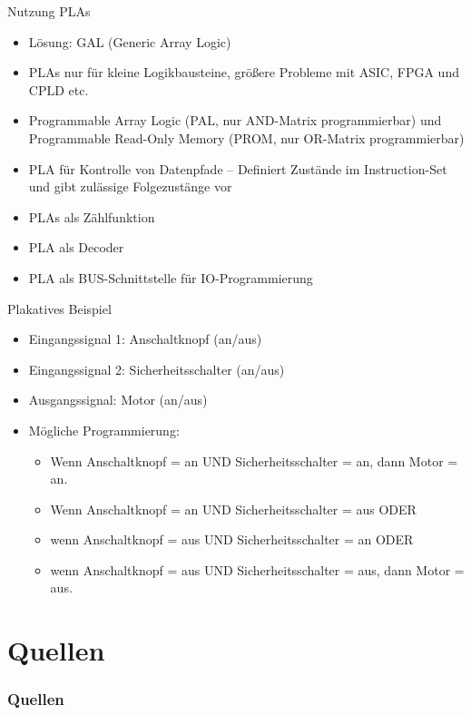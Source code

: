 \documentclass[12pt%
,xcolor=table
,aspectratio=169%
]{beamer}
\begin{document}
\begin{frame}{Nutzung PLAs}
\begin{itemize}
	\item Lösung: GAL (Generic Array Logic)
	\item PLAs nur für kleine Logikbausteine, größere Probleme mit ASIC, FPGA und CPLD etc.
	\item Programmable Array Logic (PAL, nur AND-Matrix programmierbar) und Programmable Read-Only Memory (PROM, nur OR-Matrix programmierbar)
	\item PLA für Kontrolle von Datenpfade -- Definiert Zustände im Instruction-Set und gibt zulässige Folgezustänge vor
	\item PLAs als Zählfunktion
	\item PLA als Decoder 
	\item PLA als BUS-Schnittstelle für IO-Programmierung
\end{itemize}
\end{frame}

\begin{frame}{Plakatives Beispiel}
\begin{itemize}
	\item Eingangssignal 1:  Anschaltknopf (an/aus)
	\item Eingangssignal 2:  Sicherheitsschalter (an/aus)
	\item Ausgangssignal:    Motor (an/aus)
	\item Mögliche Programmierung: 
	\begin{itemize}
		\item Wenn Anschaltknopf = an  UND  Sicherheitsschalter = an,  dann Motor = an.
		\item Wenn Anschaltknopf = an  UND  Sicherheitsschalter = aus  ODER
		\item wenn Anschaltknopf = aus UND  Sicherheitsschalter = an   ODER
		\item wenn Anschaltknopf = aus UND  Sicherheitsschalter = aus, dann Motor = aus.
	\end{itemize}
\end{itemize}
\cite{WikiPLA}
\end{frame}



\section*{Quellen}
\appendix
\begin{frame}[allowframebreaks]
  \frametitle<presentation>{Quellen}
\printbibliography
\end{frame}
\end{document}
